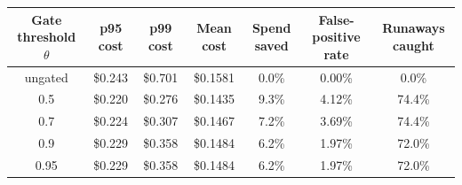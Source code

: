 \begin{tabular}{@{}ccccccc@{}}
\toprule
Gate threshold $\theta$ & p95 cost & p99 cost & Mean cost & Spend saved & False-positive rate & Runaways caught \\
\midrule
ungated & \$0.243 & \$0.701 & \$0.1581 & 0.0\% & 0.00\% & 0.0\% \\
0.5 & \$0.220 & \$0.276 & \$0.1435 & 9.3\% & 4.12\% & 74.4\% \\
0.7 & \$0.224 & \$0.307 & \$0.1467 & 7.2\% & 3.69\% & 74.4\% \\
0.9 & \$0.229 & \$0.358 & \$0.1484 & 6.2\% & 1.97\% & 72.0\% \\
0.95 & \$0.229 & \$0.358 & \$0.1484 & 6.2\% & 1.97\% & 72.0\% \\
\bottomrule
\end{tabular}
